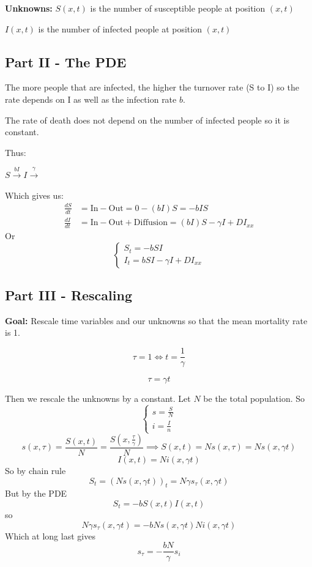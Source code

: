 \documentclass[12pt]{article}
\begin{document}
\textbf{Unknowns:}
$S(x, t)$ is the number of susceptible people at position $(x, t)$

$I(x, t)$ is the number of infected people at position $(x, t)$

\subsection*{Part II - The PDE}
The more people that are infected, the higher the turnover rate (S to I) so the rate depends on I as well as the infection rate $b$. 

The rate of death does not depend on the number of infected people so it is constant. 

Thus:
\begin{center}
    \Large\(\boxed{S} \overset{bI}{\to} \boxed{I} \overset{\gamma}{\to}\)
\end{center}
Which gives us:
\begin{align*}
    \frac{dS}{dt} &= \text{In} - \text{Out} = 0 - (bI) S = -bIS\\
    \frac{dI}{dt} &= \text{In} - \text{Out} + \text{Diffusion} = (bI)S - \gamma I + DI_{xx}
\end{align*} 
Or 
\[\begin{cases}
    S_t = -bSI\\
    I_t = bSI - \gamma I + DI_{xx}
\end{cases}\]

\subsection*{Part III - Rescaling}
\textbf{Goal:} Rescale time variables and our unknowns so that the mean mortality rate is 1. 

\[\tau = 1 \iff t = \frac{1}{\gamma}\]

\[\boxed{\tau = \gamma t}\]

Then we rescale the unknowns by a constant. Let $N$ be the total population. So 
\[\begin{cases}
    s = \frac{S}{N}\\
    i = \frac{I}{n}
\end{cases}\]
\[s(x, \tau) = \frac{S(x, t)}{N} = \frac{S(x, \frac{\tau}{\gamma})}{N} \implies S(x, t) = Ns(x, \tau) = Ns(x, \gamma t)\]
\[I(x, t) = Ni(x, \gamma t)\]
So by chain rule
\[S_t = (Ns(x, \gamma t))_t = N\gamma s_\tau(x, \gamma t)\]
But by the PDE 
\[S_t = -bS(x, t)I(x, t)\]
so 
\[N\gamma s_\tau(x, \gamma t) = -bNs(x, \gamma t)Ni(x, \gamma t)\]
Which at long last gives 
\[s_\tau = -\frac{bN}{\gamma}s_i\]
\end{document}
